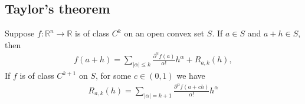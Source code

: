 \subsection{Taylor’s theorem}
\label{taylor}
Suppose $f:\mathbb{R}^n \to \mathbb{R}$ is of class $C^k$ on an open convex set $S$. If $a \in S$ and $a+h \in S$, then
\begin{align*} 
f(a+h) = \sum\limits_{|\alpha| \leq k} \frac{\partial^\alpha f(a)}{\alpha!}h^\alpha + R_{a,k}(h),
\end{align*} 
If $f$ is of class $C^{k+1}$ on $S$, for some $c \in (0, 1)$ we have
\begin{align*} 
 R_{a,k}(h) = \sum\limits_{|\alpha| = k+1} \frac{\partial^\alpha f(a+ch)}{\alpha!}h^\alpha
\end{align*} 